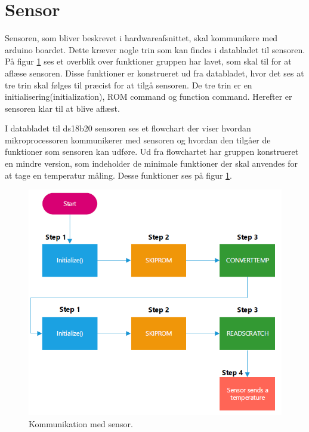 \newpage
\section{Sensor}
Sensoren, som bliver beskrevet i hardwareafsnittet, skal kommunikere med arduino boardet. Dette kræver nogle trin som kan findes i databladet til sensoren. På figur \ref{sensor_min} ses et overblik over funktioner gruppen har lavet, som skal til for at aflæse sensoren. Disse funktioner er konstrueret ud fra databladet, hvor det ses at tre trin skal følges til præcist for at tilgå sensoren. De tre trin er en initialisering(initialization), ROM command og function command. Herefter er sensoren klar til at blive aflæst.



I databladet til ds18b20 sensoren ses et flowchart der viser hvordan mikroprocessoren kommunikerer med sensoren og hvordan den tilgåer de funktioner som sensoren kan udføre. Ud fra flowchartet har gruppen konstrueret en mindre version, som indeholder de minimale funktioner der skal anvendes for at tage en temperatur måling. Desse funktioner ses på figur \ref{sensor_min}.



\begin{figure}[h!]
  \centering
  \includegraphics[width=1\textwidth]{figures/sensor_minimum.png}
  \caption{Kommunikation med sensor.}
  \label{sensor_min}
\end{figure}
\\



